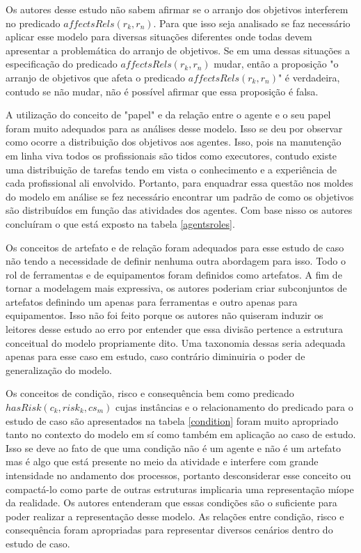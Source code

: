 Os autores desse estudo não sabem afirmar se o arranjo dos objetivos interferem no predicado $affectsRels(r_k,r_n)$. Para que isso seja analisado se faz necessário aplicar esse modelo para diversas situações diferentes onde todas devem apresentar a problemática do arranjo de objetivos. Se em uma dessas situações a especificação do predicado $affectsRels(r_k,r_n)$ mudar, então a proposição "o arranjo de objetivos que afeta o predicado $affectsRels(r_k,r_n)$" é verdadeira, contudo se não mudar, não é possível afirmar que essa proposição é falsa. 

A utilização do conceito de "papel" e da relação entre o agente e o seu papel foram muito adequados para as análises desse modelo. Isso se deu por observar como ocorre a distribuição dos objetivos aos agentes. Isso, pois na manutenção em linha viva todos os profissionais são tidos como executores, contudo existe uma distribuição de tarefas tendo em vista o conhecimento e a experiência de cada profissional ali envolvido. Portanto, para enquadrar essa questão nos moldes do modelo em análise se fez necessário encontrar um padrão de como os objetivos são distribuídos em função das atividades dos agentes. Com base nisso os autores concluíram o que está exposto na tabela \ref{agentsroles}.

Os conceitos de artefato e de relação foram adequados para esse estudo de caso não tendo a necessidade de definir nenhuma outra abordagem para isso. Todo o rol de ferramentas e de equipamentos foram definidos como artefatos. A fim de tornar a modelagem mais expressiva, os autores poderiam criar subconjuntos de artefatos definindo um apenas para ferramentas e outro apenas para equipamentos. Isso não foi feito porque os autores não quiseram induzir os leitores desse estudo ao erro por entender que essa divisão pertence a estrutura conceitual do modelo propriamente dito. Uma taxonomia dessas seria adequada apenas para esse caso em estudo, caso contrário diminuiria o poder de generalização do modelo. 

Os conceitos de condição, risco e consequência bem como predicado $hasRisk(c_k,risk_k,cs_m)$ cujas instâncias e o relacionamento do predicado para o estudo de caso são apresentados na tabela \ref{condition} foram muito apropriado tanto no contexto do modelo em sí como também em aplicação ao caso de  estudo. Isso se deve ao fato de que uma condição não é um agente e não é um artefato mas é algo que está presente no meio da atividade e interfere com grande intensidade no andamento dos processos, portanto desconsiderar esse conceito ou compactá-lo como parte de outras estruturas implicaria uma representação míope da realidade. Os autores entenderam que essas condições são o suficiente para poder realizar a representação desse modelo. As relações entre condição, risco e consequência foram apropriadas para representar diversos cenários dentro do estudo de caso. 

